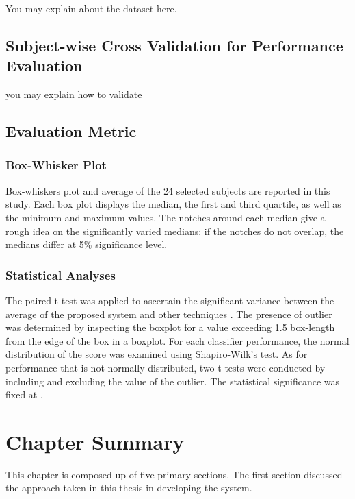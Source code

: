 You may explain about the dataset here.



\subsection{Subject-wise Cross Validation for Performance Evaluation}    

you may explain how to validate



\subsection{Evaluation Metric}



\subsubsection{Box-Whisker Plot}

Box-whiskers plot and average \Fmeasure of the 24 selected subjects are reported in this study. Each box plot displays the median, the first and third quartile, as well as the minimum and maximum values. 
The notches around each median give a rough idea on the significantly varied medians: if the notches do not overlap, the medians differ at  5\% significance level. 


\subsubsection{Statistical Analyses}

The paired t-test was applied to ascertain the significant variance between the average \Fmeasure  of the proposed system and other techniques \cite{Demsar_2006}. The presence of outlier was determined by inspecting the boxplot for a value exceeding 1.5 box-length from the edge of the box in a boxplot. For each classifier performance, the normal distribution of the \Fmeasure  score was examined using Shapiro-Wilk’s test. As for \Fmeasure  performance that is not normally distributed, two t-tests were conducted by including and excluding the value of the outlier. The statistical significance was fixed at \LeqPointFive.


\section{Chapter Summary}
This chapter is composed up of five primary sections. The first section discussed the approach taken in this thesis in developing the system.


